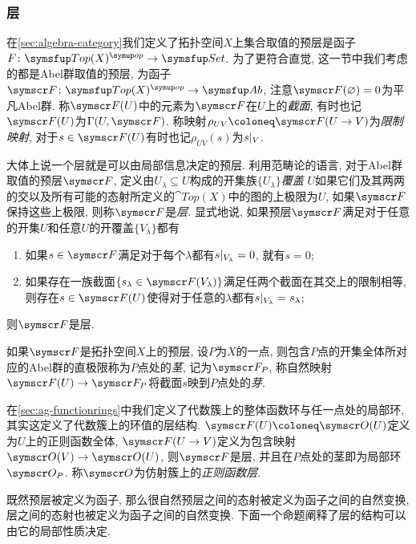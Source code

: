 \subsubsection{层}

在\ref{sec:algebra-category}我们定义了拓扑空间$X$上集合取值的预层是函子$F\colon \cat{Top}(X)^{\op}\to\cat{Set}$. 为了更符合直觉, 这一节中我们考虑的都是Abel群取值的预层, 为函子$\sheaf{F}\colon \cat{Top}(X)^{\op}\to\cat{Ab}$, 注意$\sheaf{F}(\varnothing)=0$为平凡Abel群. 称$\sheaf{F}(U)$中的元素为$\sheaf{F}$在$U$上的\emph{截面}, 有时也记$\sheaf{F}(U)$为$\Gamma (U, \sheaf{F})$. 称映射$\rho_{UV}\coloneq \sheaf{F}(U\to V)$为\emph{限制映射}, 对于$s\in \sheaf{F}(U)$有时也记$\rho_{UV}(s)$为$s\vert_{V}$.

大体上说一个层就是可以由局部信息决定的预层. 利用范畴论的语言, 对于Abel群取值的预层$\sheaf{F}$, 定义由$U_\lambda\subseteq U$构成的开集族$\{U_\lambda\}$\emph{覆盖} $U$如果它们及其两两的交以及所有可能的态射所定义的$\cat{Top}(X)$中的图的上极限为$U$, 如果$\sheaf{F}$保持这些上极限, 则称$\sheaf{F}$是\emph{层}. 显式地说, 如果预层$\sheaf{F}$满足对于任意的开集$U$和任意$U$的开覆盖$\{V_\lambda\}$都有
\begin{enumerate}
  \item 如果$s\in\sheaf{F}$满足对于每个$\lambda$都有$s\vert_{V_{\lambda}}=0$, 就有$s=0$;
  \item 如果存在一族截面$\{s_\lambda\in\sheaf{F(V_\lambda)}\}$满足任两个截面在其交上的限制相等, 则存在$s\in\sheaf{F(U)}$使得对于任意的$\lambda$都有$s\vert_{V_\lambda}=s_{\lambda}$;
\end{enumerate}
则$\sheaf{F}$是层.

如果$\sheaf{F}$是拓扑空间$X$上的预层, 设$P$为$X$的一点, 则包含$P$点的开集全体所对应的Abel群的直极限称为$P$点处的\emph{茎}, 记为$\sheaf{F}_P$, 称自然映射$\sheaf{F}(U)\to \sheaf{F}_P$将截面$s$映到$P$点处的\emph{芽}.

\begin{example}
  在\ref{sec:ag-functionrings}中我们定义了代数簇上的整体函数环与任一点处的局部环, 其实这定义了代数簇上的环值的层结构. $\sheaf{F}(U)\coloneq\OO (U)$定义为$U$上的正则函数全体, $\sheaf{F}(U\to V)$定义为包含映射$\OO (V)\to \OO(U)$, 则$\sheaf{F}$是层, 并且在$P$点处的茎即为局部环$\OO_P$. 称$\OO$为仿射簇上的\emph{正则函数层}.
\end{example}

既然预层被定义为函子, 那么很自然预层之间的态射被定义为函子之间的自然变换, 层之间的态射也被定义为函子之间的自然变换. 下面一个命题阐释了层的结构可以由它的局部性质决定.

